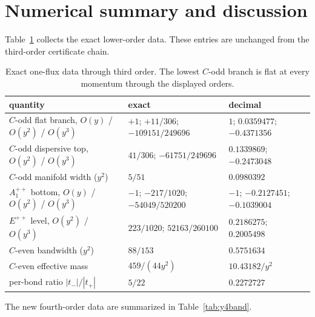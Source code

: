 \documentclass[11pt]{article}
\begin{document}
\section{Numerical summary and discussion}
\label{sec:numbers}

Table~\ref{tab:lowerbands} collects the exact lower-order data. These entries
are unchanged from the third-order certificate chain.

\begin{table}[ht]
\centering
\scriptsize
\begin{tabular}{lll}
\toprule
quantity & exact & decimal \\
\midrule
$C$-odd flat branch, $O(y)$ / $O(y^2)$ / $O(y^3)$ &
$+1$; $+11/306$; $-109151/249696$ &
$1$; $0.0359477$; $-0.4371356$ \\
$C$-odd dispersive top, $O(y^2)$ / $O(y^3)$ &
$41/306$; $-61751/249696$ & $0.1339869$; $-0.2473048$ \\
$C$-odd manifold width ($y^2$) & $5/51$ & $0.0980392$ \\
$A_1^{++}$ bottom, $O(y)$ / $O(y^2)$ / $O(y^3)$ &
$-1$; $-217/1020$; $-54049/520200$ &
$-1$; $-0.2127451$; $-0.1039004$ \\
$E^{++}$ level, $O(y^2)$ / $O(y^3)$ &
$223/1020$; $52163/260100$ & $0.2186275$; $0.2005498$ \\
$C$-even bandwidth ($y^2$) & $88/153$ & $0.5751634$ \\
$C$-even effective mass & $459/(44y^2)$ & $10.43182/y^2$ \\
per-bond ratio $|t_-|/|t_+|$ & $5/22$ & $0.2272727$ \\
\bottomrule
\end{tabular}
\caption{Exact one-flux data through third order. The lowest $C$-odd branch
is flat at every momentum through the displayed orders.}
\label{tab:lowerbands}
\end{table}

The new fourth-order data are summarized in Table~\ref{tab:y4band}.
\end{document}

